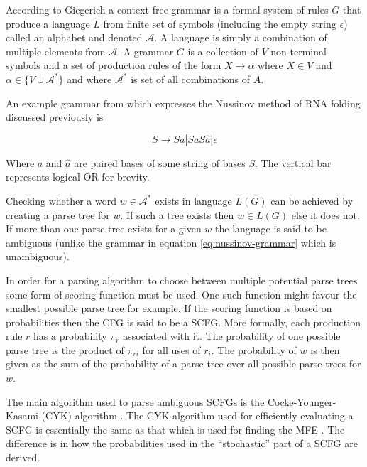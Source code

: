 \documentclass[journal]{IEEEtran}
\begin{document}
According to Giegerich\cite{giegerich2014introduction} a context free grammar is a formal system of rules $G$ that produce a language $L$ from finite set of symbols (including the empty string $\epsilon$) called an alphabet and denoted $\mathcal{A}$. A language is simply a combination of multiple elements from $\mathcal{A}$. A grammar $G$ is a collection of $V$ non terminal symbols and a set of production rules of the form $X \rightarrow \alpha$ where $X \in V$ and $\alpha \in \{V \cup \mathcal{A}^*\}$ and where $\mathcal{A}^*$ is set of all combinations of $A$.

An example grammar from \cite{rivas2013four} which expresses the Nussinov method \cite{nussinov1980fast} of RNA folding discussed previously is

\begin{equation}
	\label{eq:nussinov-grammar}
	S \rightarrow S a | S a S \hat{a} | \epsilon
\end{equation} 

Where $a$ and $\hat{a}$ are paired bases of some string of bases $S$. The vertical bar represents logical OR for brevity.

Checking whether a word $w \in \mathcal{A}^*$ exists in language $L(G)$ can be achieved by creating a parse tree for $w$. If such a tree exists then $w \in L(G)$ else it does not. If more than one parse tree exists for a given $w$ the language is said to be ambiguous (unlike the grammar in equation \ref{eq:nussinov-grammar} which is unambiguous).

In order for a parsing algorithm to choose between multiple potential parse trees some form of scoring function must be used. One such function might favour the smallest possible parse tree for example. If the scoring function is based on probabilities then the CFG is said to be a SCFG. More formally, each production rule $r$ has a probability $\pi_r$ associated with it. The probability of one possible parse tree is the product of $\pi_{ri}$ for all uses of $r_i$. The probability of $w$ is then given as the sum of the probability of a parse tree over all possible parse trees for $w$.

The main algorithm used to parse ambiguous SCFGs is the Cocke-Younger-Kasami (CYK) algorithm \cite{giegerich2014introduction, cocke1969programming, younger1967recognition, kasami1965efficient} . The CYK algorithm used for efficiently evaluating a SCFG is essentially the same as that which is used for finding the MFE \cite{zuker1981optimal}. The difference is in how the probabilities used in the ``stochastic'' part of a SCFG are derived.
\end{document}
